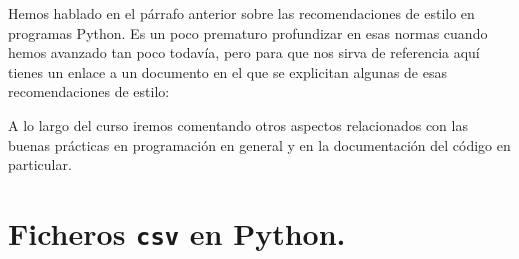\documentclass[10pt,a4paper]{article}\usepackage[]{graphicx}\usepackage[]{color}
\begin{document}
Hemos hablado en el párrafo anterior sobre las recomendaciones de estilo en programas Python. Es un poco prematuro profundizar en esas normas cuando hemos avanzado tan poco todavía, pero para que nos sirva de referencia aquí tienes un enlace a un documento en el que se explicitan algunas de esas recomendaciones de estilo:
\begin{center}
\end{center}

A lo largo del curso iremos comentando otros aspectos relacionados con las buenas prácticas en programación en general y en la documentación del código en particular.

\section{Ficheros {\tt csv} en Python.}
\label{tut02:sec:ficherosCsvPython}
\end{document}
